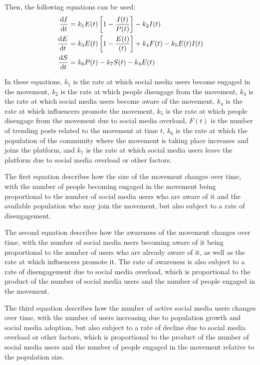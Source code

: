 \documentclass{article}
\begin{document}
    Then, the following equations can be used:
        \begin{align}
            \diff It &= k_1 E(t) \left[1 - \frac{I(t)}{P(t)}\right] - k_2I(t)
            \\
            \diff Et &= k_3 E(t)\left[1 - \frac{E(t)}{(t)}\right] + k_4 F(t) - k_5 E(t)I(t)
            \\
            \diff St &= k_6 P(t) - k_7S(t) - k_3 {E(t)}
        \end{align}

    In these equations, $k_1$ is the rate at which social media users become engaged in the movement, $k_2$ is the rate at which people disengage from the movement, $k_3$ is the rate at which social media users become aware of the movement, $k_4$ is the rate at which influencers promote the movement, $k_5$ is the rate at which people disengage from the movement due to social media overload, $F(t)$ is the number of trending posts related to the movement at time $t$, $k_6$ is the rate at which the population of the community where the movement is taking place increases and joins the platform, and $k_7$ is the rate at which social media users leave the platform due to social media overload or other factors.
    
    The first equation describes how the size of the movement changes over time, with the number of people becoming engaged in the movement being proportional to the number of social media users who are aware of it and the available population who may join the movement, but also subject to a rate of disengagement. 
    
	The second equation describes how the awareness of the movement changes over time, with the number of social media users becoming aware of it being proportional to the number of users who are already aware of it, as well as the rate at which influencers promote it. The rate of awareness is also subject to a rate of disengagement due to social media overload, which is proportional to the product of the number of social media users and the number of people engaged in the movement. 
 
	The third equation describes how the number of active social media users changes over time, with the number of users increasing due to population growth and social media adoption, but also subject to a rate of decline due to social media overload or other factors, which is proportional to the product of the number of social media users and the number of people engaged in the movement relative to the population size. 
 
\end{document}
